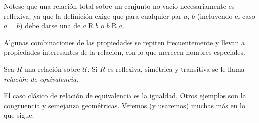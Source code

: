
  Nótese que una relación total
  sobre un conjunto no vacío necesariamente es reflexiva,
  ya que la definición exige que para cualquier par \(a\), \(b\)
  (incluyendo el caso \(a = b\))
  debe darse una de \(a \mathrel{R} b\) o \(b \mathrel{R} a\).

  Algunas combinaciones de las propiedades se repiten frecuentemente
  y llevan a propiedades interesantes de la relación,
  con lo que merecen nombres especiales.
  \begin{definition}
    Sea \(R\) una relación sobre \(\mathcal{U}\).
    Si \(R\) es reflexiva, simétrica y transitiva
    se le llama \emph{relación de equivalencia}.
  \end{definition}
  El caso clásico de relación de equivalencia es la igualdad.
  Otros ejemplos son la congruencia y semejanza geométricas.
  Veremos
  (y usaremos)
  muchas más en lo que sigue.

